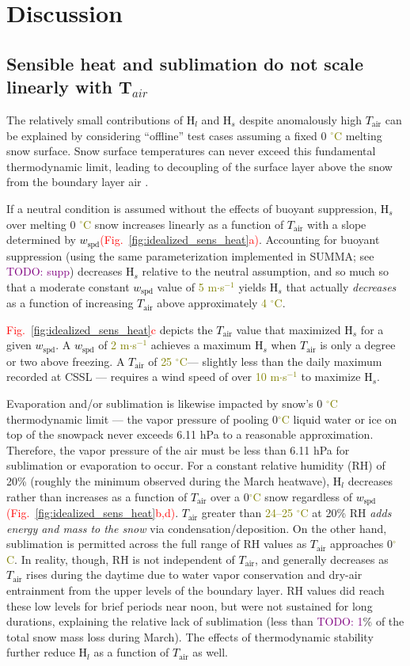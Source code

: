 \documentclass[draft]{agujournal2019}
\newcommand{\fig}[2]{\textcolor{red}{(Fig.~\ref{#1}{#2})}}   %
\newcommand{\fignop}[2]{\textcolor{red}{Fig.~\ref{#1}{#2}}}  %
\newcommand{\todo}[1]{\textcolor{purple}{TODO: #1}}      %
\newcommand{\mynum}[1]{\textcolor{olive}{#1}}
\newcommand{\tair}{\textcolor{black}{$T_{\mathrm{air}}$}\xspace}
\newcommand{\wspd}{\textcolor{black}{$w_{\mathrm{spd}}$}\xspace}
\newcommand{\hs}{\textcolor{black}{H$_s$}\xspace}
\newcommand{\hlat}{\textcolor{black}{H$_l$}\xspace}
\newcommand{\ms}{\textcolor{olive}{m$\cdot$s$^{-1}$}\xspace}
\newcommand{\degrc}{\textcolor{olive}{$^\circ$C}\xspace}
\begin{document}
\section{Discussion}
\subsection{Sensible heat and sublimation do not scale linearly with T$_{air}$}
The relatively small contributions of \hlat and \hs despite anomalously high \tair can be explained by considering ``offline'' test cases assuming a fixed 0 \degrc melting snow surface.
Snow surface temperatures can never exceed this fundamental thermodynamic limit, leading to decoupling of the surface layer above the snow from the boundary layer air \cite{Mott2013-jt}.

If a neutral condition is assumed without the effects of buoyant suppression, \hs over melting 0 \degrc snow increases linearly as a function of \tair with a slope determined by \wspd \fig{fig:idealized_sens_heat}{a}.
Accounting for buoyant suppression (using the same parameterization implemented in SUMMA; see \todo{supp}) decreases \hs relative to the neutral assumption, and so much so that a moderate constant \wspd value of \mynum{5} \ms yields \hs that actually \textit{decreases} as a function of increasing \tair above approximately \mynum{4} \degrc.

\fignop{fig:idealized_sens_heat}{c} depicts the \tair value that maximized \hs for a given \wspd.
A \wspd of \mynum{2} \ms achieves a maximum \hs when \tair is only a degree or two above freezing.
A \tair of \mynum{25} \degrc --- slightly less than the daily maximum recorded at CSSL --- requires a wind speed of over \mynum{10} \ms to maximize \hs.

Evaporation and/or sublimation is likewise impacted by snow's 0 \degrc thermodynamic limit --- the vapor pressure of pooling 0\degrc liquid water or ice on top of the snowpack never exceeds 6.11 hPa to a reasonable approximation.
Therefore, the vapor pressure of the air must be less than 6.11 hPa for sublimation or evaporation to occur.
For a constant relative humidity (RH) of 20\% (roughly the minimum observed during the March heatwave), \hlat decreases rather than increases as a function of \tair over a 0\degrc snow regardless of \wspd \fig{fig:idealized_sens_heat}{b,d}.
\tair greater than \mynum{24--25} \degrc at 20\% RH \textit{adds energy and mass to the snow} via condensation/deposition.
On the other hand, sublimation is permitted across the full range of RH values as \tair approaches 0\degrc.
In reality, though, RH is not independent of \tair, and generally decreases as \tair rises during the daytime due to water vapor conservation and dry-air entrainment from the upper levels of the boundary layer.
RH values did reach these low levels for brief periods near noon, but were not sustained for long durations, explaining the relative lack of sublimation (less than \todo{1}\% of the total snow mass loss during March).
The effects of thermodynamic stability further reduce \hlat as a function of \tair as well.
\end{document}
